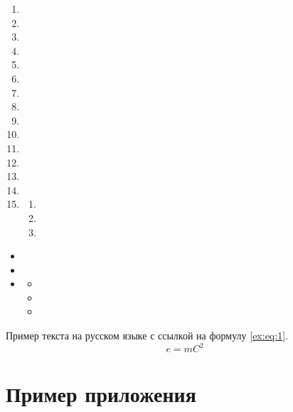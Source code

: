 \documentclass[
    xelatex,
    chapter-numbering,
]{G7-32-2017}
\begin{document}
\lipsum[1][1]
\begin{enumerate}
    \item \lipsum[1][1-2]
    \item \lipsum[1][3-4]
    \item \lipsum[1][5-6]
    \item \lipsum[1][1-2]
    \item \lipsum[1][3-4]
    \item \lipsum[1][5-6]
    \item \lipsum[1][1-2]
    \item \lipsum[1][3-4]
    \item \lipsum[1][5-6]
    \item \lipsum[1][1-2]
    \item \lipsum[1][3-4]
    \item \lipsum[1][5-6]
    \item \lipsum[1][1-2]
    \item \lipsum[1][3-4]
    \item \lipsum[1][5-6]
    \begin{enumerate}
        \item \lipsum[2][1-3]
        \item \lipsum[2][2]
        \item \lipsum[2][3]
    \end{enumerate}
\end{enumerate}
\begin{itemize}
    \item \lipsum[1][1-2]
    \item \lipsum[1][3-4]
    \item \lipsum[1][5-6]
    \begin{itemize}
        \item \lipsum[2][1-3]
        \item \lipsum[2][2]
        \item \lipsum[2][3]
    \end{itemize}
\end{itemize}

Пример текста на русском языке с ссылкой на формулу \eqref{ex:eq:1}.
\begin{equation}
    \label{ex:eq:1}
    e = mC^2
\end{equation}

\backmatter

\Conclusion

\lipsum[1-5]


\appendix

\chapter{Пример приложения}
\end{document}
